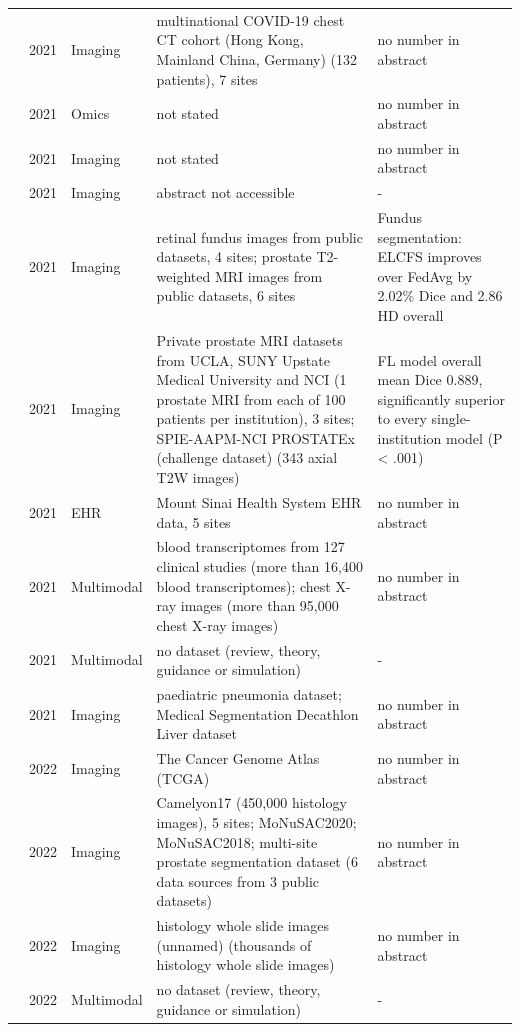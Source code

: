 \begin{longtable}{@{}p{2.6cm}p{0.7cm}p{1.2cm}p{4.4cm}p{4.6cm}@{}}
\cite{dou2021federated} & 2021 & Imaging & multinational COVID-19 chest CT cohort (Hong Kong, Mainland China, Germany) (132 patients), 7 sites & no number in abstract\\
\cite{froelicher2021truly} & 2021 & Omics & not stated & no number in abstract\\
\cite{guo2021multi} & 2021 & Imaging & not stated & no number in abstract\\
\cite{kaissis2021end} & 2021 & Imaging & abstract not accessible & -\\
\cite{liu2021feddg} & 2021 & Imaging & retinal fundus images from public datasets, 4 sites; prostate T2-weighted MRI images from public datasets, 6 sites & Fundus segmentation: ELCFS improves over FedAvg by 2.02\% Dice and 2.86 HD overall\\
\cite{sarma2021federated} & 2021 & Imaging & Private prostate MRI datasets from UCLA, SUNY Upstate Medical University and NCI (1 prostate MRI from each of 100 patients per institution), 3 sites; SPIE-AAPM-NCI PROSTATEx (challenge dataset) (343 axial T2W images) & FL model overall mean Dice 0.889, significantly superior to every single-institution model (P < .001)\\
\cite{vaid2021federated} & 2021 & EHR & Mount Sinai Health System EHR data, 5 sites & no number in abstract\\
\cite{warnatherresthal2021swarm} & 2021 & Multimodal & blood transcriptomes from 127 clinical studies (more than 16,400 blood transcriptomes); chest X-ray images (more than 95,000 chest X-ray images) & no number in abstract\\
\cite{xu2021federated} & 2021 & Multimodal & no dataset (review, theory, guidance or simulation) & -\\
\cite{ziller2021medical} & 2021 & Imaging & paediatric pneumonia dataset; Medical Segmentation Decathlon Liver dataset & no number in abstract\\
\cite{adnan2022federated} & 2022 & Imaging & The Cancer Genome Atlas (TCGA) & no number in abstract\\
\cite{jiang2022harmofl} & 2022 & Imaging & Camelyon17 (450,000 histology images), 5 sites; MoNuSAC2020; MoNuSAC2018; multi-site prostate segmentation dataset (6 data sources from 3 public datasets) & no number in abstract\\
\cite{lu2022federated} & 2022 & Imaging & histology whole slide images (unnamed) (thousands of histology whole slide images) & no number in abstract\\
\cite{nguyen2022federated} & 2022 & Multimodal & no dataset (review, theory, guidance or simulation) & -\\

\end{longtable}
